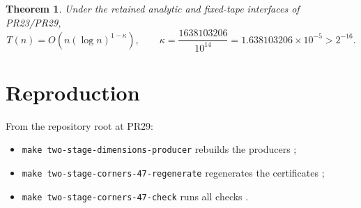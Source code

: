 \documentclass[11pt]{article}
\newtheorem{theorem}{Theorem}
\begin{document}
\begin{theorem}
Under the retained analytic and fixed-tape interfaces of PR23/PR29,
\[
 T(n)=O\!\left(n(\log n)^{1-\kappa}\right),\qquad
 \kappa=\frac{1638103206}{10^{14}}=1.638103206\times10^{-5}>2^{-16}.
\]
\end{theorem}

\section{Reproduction}
From the repository root at PR29:
\begin{itemize}
\item \texttt{make two-stage-dimensions-producer} rebuilds the
producers ;
\item \texttt{make two-stage-corners-47-regenerate} regenerates the
certificates ;
\item \texttt{make two-stage-corners-47-check} runs all checks .
\end{itemize}
\end{document}
